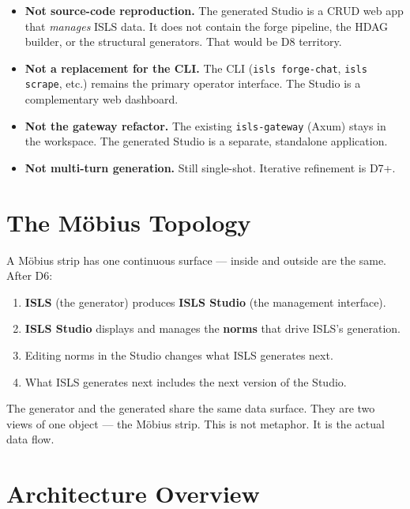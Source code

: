 \documentclass[11pt,a4paper]{article}
\begin{document}
\begin{itemize}[nosep]
\item \textbf{Not source-code reproduction.} The generated Studio is
      a CRUD web app that \emph{manages} ISLS data. It does not
      contain the forge pipeline, the HDAG builder, or the structural
      generators. That would be D8 territory.
\item \textbf{Not a replacement for the CLI.} The CLI (\texttt{isls
      forge-chat}, \texttt{isls scrape}, etc.) remains the primary
      operator interface. The Studio is a complementary web dashboard.
\item \textbf{Not the gateway refactor.} The existing
      \texttt{isls-gateway} (Axum) stays in the workspace. The
      generated Studio is a separate, standalone application.
\item \textbf{Not multi-turn generation.} Still single-shot. Iterative
      refinement is D7+.
\end{itemize}


\section{The M\"obius Topology}

A M\"obius strip has one continuous surface --- inside and outside are
the same. After D6:

\begin{enumerate}[nosep]
\item \textbf{ISLS} (the generator) produces \textbf{ISLS Studio}
      (the management interface).
\item \textbf{ISLS Studio} displays and manages the \textbf{norms}
      that drive ISLS's generation.
\item Editing norms in the Studio changes what ISLS generates next.
\item What ISLS generates next includes the next version of the Studio.
\end{enumerate}

The generator and the generated share the same data surface. They are
two views of one object --- the M\"obius strip. This is not metaphor.
It is the actual data flow.


\section{Architecture Overview}
\end{document}
